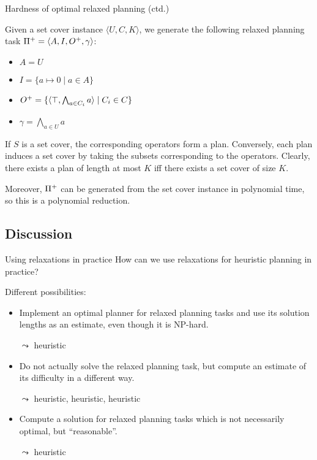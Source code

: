 \documentclass{gkibeamer}
\begin{document}
\begin{frame}{Hardness of optimal relaxed planning (ctd.)}
  \begin{proofend}
    Given a set cover instance $\langle U, C, K\rangle$, we generate
    the following relaxed planning task
    ${\Pi}^+ = \langle A, I, {O}^+, \gamma\rangle$:
    \begin{itemize}
    \item $A = U$
    \item $I = \{a \mapsto 0 \mid a \in A\}$
    \item ${O}^+ =
      \{\langle \top, \bigwedge_{a \in C_i} a \rangle
      \mid C_i \in C\}$
    \item $\gamma = \bigwedge_{a \in U} a$
    \end{itemize}

    If $S$ is a set cover, the corresponding operators form a plan.
    Conversely, each plan induces a set cover by taking the subsets
    corresponding to the operators. Clearly, there exists a plan of
    length at most $K$ iff there exists a set cover of size $K$.

    \smallskip

    Moreover, ${\Pi}^+$ can be generated from the set cover
    instance in polynomial time, so this is a polynomial reduction.
  \end{proofend}
\end{frame}

\subsection{Discussion}

\begin{frame}{Using relaxations in practice}
  How can we use relaxations for heuristic planning in practice?

  \medskip

  Different possibilities:
  \begin{itemize}
  \item Implement an \alert{optimal planner} for relaxed planning
    tasks and use its solution lengths as an estimate, even though it
    is NP-hard.

    $\leadsto$ \alert{{\hplus} heuristic}
  \item Do not actually solve the relaxed planning task, but compute
    an estimate of its difficulty in a different way.

    $\leadsto$ \alert{{\hmax} heuristic}, \alert{{\hadd} heuristic},
    \alert{{\hlmcut} heuristic}
  \item Compute a solution for relaxed planning tasks which is not
    necessarily optimal, but ``reasonable''.

    $\leadsto$ \alert{{\hff} heuristic}
  \end{itemize}
\end{frame}
\end{document}
